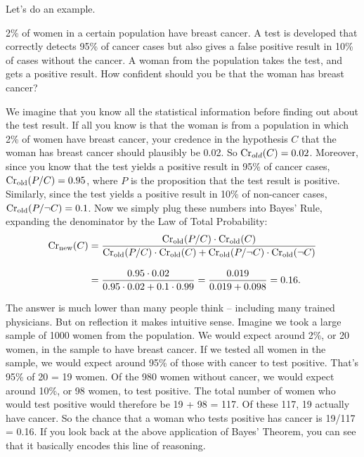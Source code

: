 Let's do an example.
\begin{example}\label{ex:base}
  2\% of women in a certain population have breast cancer. A test is
  developed that correctly detects 95\% of cancer cases but also gives
  a false positive result in 10\% of cases without the cancer. A woman
  from the population takes the test, and gets a positive result. How
  confident should you be that the woman has breast cancer?
\end{example}

We imagine that you know all the statistical information before
finding out about the test result. If all you know is that the woman
is from a population in which 2\% of women have breast cancer, your
credence in the hypothesis $C$ that the woman has breast cancer should
plausibly be 0.02. So $\text{Cr}_{old}(C) = 0.02$. Moreover, since you know
that the test yields a positive result in 95\% of cancer cases,
$\text{Cr}_{\text{old}}(P/C) = 0.95$, where $P$ is the proposition that the
test result is positive. Similarly, since the test yields a positive
result in 10\% of non-cancer cases, $\text{Cr}_{\text{old}}(P/\neg C) =
0.1$. Now we simply plug these numbers into Bayes' Rule, expanding the
denominator by the Law of Total Probability:
%
\begin{align*}
  \text{Cr}_{\text{new}}(C) &= \frac{\text{Cr}_{\text{old}}(P/C) \cdot
  \text{Cr}_{\text{old}}(C)}{\text{Cr}_\text{old}(P/C) \cdot \text{Cr}_\text{old}(C) +
  \text{Cr}_\text{old}(P/\neg C)\cdot \text{Cr}_\text{old}(\neg C)}\\[3mm]
  &= \frac{0.95 \cdot 0.02}{0.95 \cdot 0.02 + 0.1 \cdot 0.99} = \frac{0.019}{0.019 + 0.098} = 0.16.
\end{align*}

The answer is much lower than many people think -- including many trained 
physicians. But on reflection it makes intuitive sense. Imagine we
took a large sample of 1000 women from the population. We would expect
around 2\%, or 20 women, in the sample to have breast cancer. If we
tested all women in the sample, we would expect around 95\% of those
with cancer to test positive. That's 95\% of 20 = 19 women. Of the 980
women without cancer, we would expect around 10\%, or 98 women, to
test positive. The total number of women who would test positive would
therefore be 19 + 98 = 117. Of these 117, 19 actually have cancer. So the
chance that a woman who tests positive has cancer is 19/117 = 0.16. If
you look back at the above application of Bayes' Theorem, you can see
that it basically encodes this line of reasoning.

